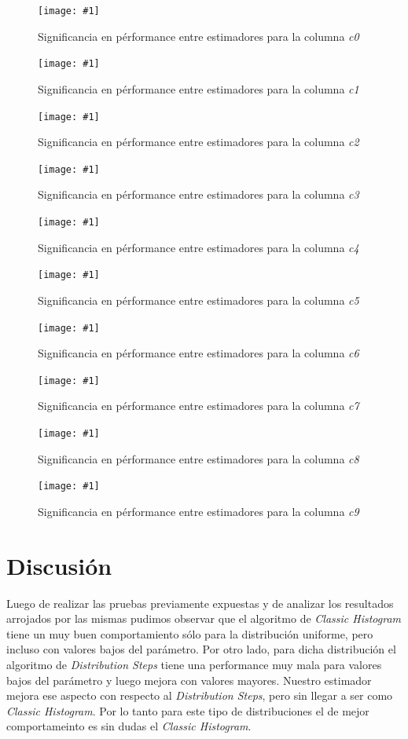 \documentclass[a4paper, 10pt, twoside]{article}
\newcommand{\grafico}[3]{
  \begin{figure}[H]
    \texttt{[image: \#1]}
    \caption{#2}
    \label{#3}
  \end{figure}
}
\begin{document}
\grafico{plot-significance-c0}
        {Significancia en pérformance entre estimadores para la columna \emph{c0}}
        {student-columna-c0}

\grafico{plot-significance-c1}
        {Significancia en pérformance entre estimadores para la columna \emph{c1}}
        {student-columna-c1}

\grafico{plot-significance-c2}
        {Significancia en pérformance entre estimadores para la columna \emph{c2}}
        {student-columna-c2}

\grafico{plot-significance-c3}
        {Significancia en pérformance entre estimadores para la columna \emph{c3}}
        {student-columna-c3}

\grafico{plot-significance-c4}
        {Significancia en pérformance entre estimadores para la columna \emph{c4}}
        {student-columna-c4}

\grafico{plot-significance-c5}
        {Significancia en pérformance entre estimadores para la columna \emph{c5}}
        {student-columna-c5}

\grafico{plot-significance-c6}
        {Significancia en pérformance entre estimadores para la columna \emph{c6}}
        {student-columna-c6}

\grafico{plot-significance-c7}
        {Significancia en pérformance entre estimadores para la columna \emph{c7}}
        {student-columna-c7}

\grafico{plot-significance-c8}
        {Significancia en pérformance entre estimadores para la columna \emph{c8}}
        {student-columna-c8}

\grafico{plot-significance-c9}
        {Significancia en pérformance entre estimadores para la columna \emph{c9}}
        {student-columna-c9}



\section{Discusión}

Luego de realizar las pruebas previamente expuestas y de analizar los resultados arrojados por las mismas pudimos observar que el algoritmo de \textit{Classic Histogram}
tiene un muy buen comportamiento sólo para la distribución uniforme, pero incluso con valores bajos del parámetro. Por otro lado, para dicha distribución el algoritmo de \textit{Distribution Steps} tiene una performance muy mala para valores bajos del parámetro y luego mejora con valores mayores. Nuestro estimador mejora ese aspecto con respecto al \textit{Distribution Steps}, pero sin llegar a ser como \textit{Classic Histogram}. Por lo tanto para este tipo de distribuciones el de mejor comportameinto es sin dudas el \textit{Classic Histogram}.
\end{document}
